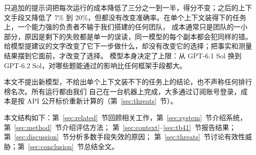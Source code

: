 只追加的提示词把每次运行的成本降低了三分之一到一半，得分不变；之后的上下文手段又降低了
7\% 到 20\%，但都没有改变准确率。在单个上下文装得下的任务上，一个能力强的负责者不输于我们搭建的任何团队，
成本通常只是团队的一小部分，原因是剩下的失败都是单一的误读，同一模型的每个副本都会犯同样的错。
给模型提建议的文字改变了它下一步做什么，却没有改变它的选择；把事实和测量结果摆到它面前，才改变了选择。
模型本身决定了上限：从 GPT-6.1 Sol 换到 GPT-6.2 Sol，对哪些题能通过的影响比任何框架手段都大。

本文不提出新模型，不给出单个上下文装不下的任务上的结论，也不声称任何排行榜名次。所有运行都由我们
自己在一台机器上完成，大多通过订阅账号登录，成本是按 API 公开标价重新计算的（第~\ref{sec:threats}~节）。

本文结构如下：第~\ref{sec:related}~节回顾相关工作，第~\ref{sec:system}~节介绍系统，第~\ref{sec:method}~节介绍评估方法；
第~\ref{sec:context}--\ref{sec:tb41}~节报告结果；第~\ref{sec:discussion}~节分析多数手段失效的原因；
第~\ref{sec:threats}~节讨论有效性威胁；第~\ref{sec:conclusion}~节总结全文。
